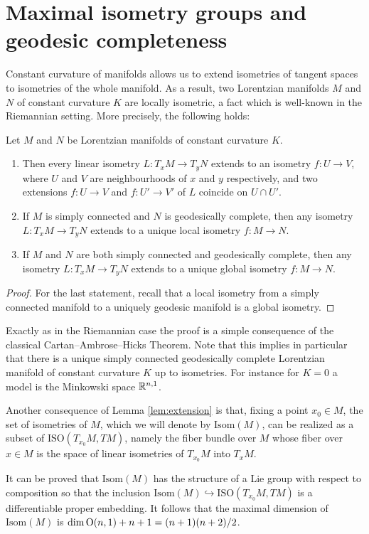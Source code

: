 \documentclass{report}
\begin{document}
\section{Maximal isometry groups and geodesic completeness}
Constant curvature of manifolds allows us to extend isometries of tangent spaces to isometries of the whole manifold.
As a result, two Lorentzian manifolds $M$ and $N$ of constant curvature $K$ are locally isometric, a fact which is well-known in the Riemannian setting. 
More precisely, the following holds:
\begin{lemma} \label{lem:extension}
Let $M$ and $N$ be Lorentzian manifolds of constant curvature $K$. 
\begin{enumerate}
    \item Then every linear isometry $L:T_xM\to T_yN$ extends to an isometry $f:U\to V$, where $U$ and $V$ are neighbourhoods of $x$ and $y$ respectively, and two extensions $f:U\to V$ and $f:U'\to V'$ of $L$ coincide on $U\cap U'$.
    \item If $M$ is simply connected and $N$ is geodesically complete, then any isometry $L: T_x M \to T_y N$ extends to a unique local isometry $f:M\to N$.
    \item If $M$ and $N$ are both simply connected and geodesically complete, then any isometry $L: T_xM\to T_yN$ extends to a unique global isometry $f:M\to N$.
\end{enumerate}
\end{lemma}
\begin{proof}
    For the last statement, recall that a local isometry from a simply connected manifold to a uniquely geodesic manifold is a global isometry.
\end{proof}
Exactly as in the Riemannian case the proof is a simple consequence of the classical Cartan--Ambrose--Hicks Theorem.
Note that this implies in particular that there is a unique simply connected geodesically complete Lorentzian manifold of constant curvature $K$ up to isometries.
For instance for $K=0$ a model is the Minkowski space $\mathbb{R}^{n,1}$.

Another consequence of Lemma \ref{lem:extension} is that, fixing a point $x_0\in M$, the set of isometries of $M$, which we will denote by $\mathrm{Isom}(M)$, can be realized as a subset of $\mathrm{ISO}(T_{x_0}M, TM)$, namely the fiber bundle over $M$ whose fiber over $x\in M$ is the space of linear isometries of $T_{x_0}M$ into $T_x M$.

It can be proved that $\mathrm{Isom}(M)$ has the structure of a Lie group with respect to composition so that the inclusion
$\mathrm{Isom}(M)\hookrightarrow\mathrm{ISO}(T_{x_0}M, TM)$ is a differentiable proper embedding.
It follows that  the maximal dimension of $\mathrm{Isom}(M)$ is
 $\dim \operatorname{{\mathrm{O}}}(n,1)+n+1=(n+1)(n+2)/2$. 
 
\end{document}

